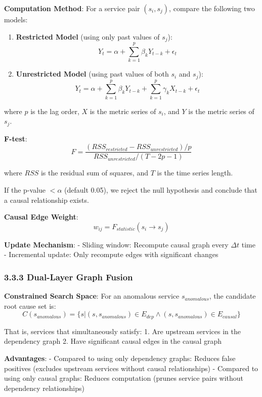 \textbf{Computation Method}: For a service pair \((s_i, s_j)\), compare
the following two models:

\begin{enumerate}
\def\labelenumi{\arabic{enumi}.}
\item
  \textbf{Restricted Model} (using only past values of \(s_j\)):
  \[Y_t = \alpha + \sum_{k=1}^{p} \beta_k Y_{t-k} + \epsilon_t\]
\item
  \textbf{Unrestricted Model} (using past values of both \(s_i\) and
  \(s_j\)):
  \[Y_t = \alpha + \sum_{k=1}^{p} \beta_k Y_{t-k} + \sum_{k=1}^{p} \gamma_k X_{t-k} + \epsilon_t\]
\end{enumerate}

where \(p\) is the lag order, \(X\) is the metric series of \(s_i\), and
\(Y\) is the metric series of \(s_j\).

\textbf{F-test}:
\[F = \frac{(RSS_{restricted} - RSS_{unrestricted}) / p}{RSS_{unrestricted} / (T - 2p - 1)}\]

where \(RSS\) is the residual sum of squares, and \(T\) is the time
series length.

If the p-value \(< \alpha\) (default 0.05), we reject the null
hypothesis and conclude that a causal relationship exists.

\textbf{Causal Edge Weight}: \[w_{ij} = F_{statistic}(s_i \to s_j)\]

\textbf{Update Mechanism}: - Sliding window: Recompute causal graph
every \(\Delta t\) time - Incremental update: Only recompute edges with
significant changes

\hypertarget{dual-layer-graph-fusion}{%
\subsubsection{3.3.3 Dual-Layer Graph
Fusion}\label{dual-layer-graph-fusion}}

\textbf{Constrained Search Space}: For an anomalous service
\(s_{anomalous}\), the candidate root cause set is:
\[C(s_{anomalous}) = \{s | (s, s_{anomalous}) \in E_{dep} \land (s, s_{anomalous}) \in E_{causal}\}\]

That is, services that simultaneously satisfy: 1. Are upstream services
in the dependency graph 2. Have significant causal edges in the causal
graph

\textbf{Advantages}: - Compared to using only dependency graphs: Reduces
false positives (excludes upstream services without causal
relationships) - Compared to using only causal graphs: Reduces
computation (prunes service pairs without dependency relationships)

